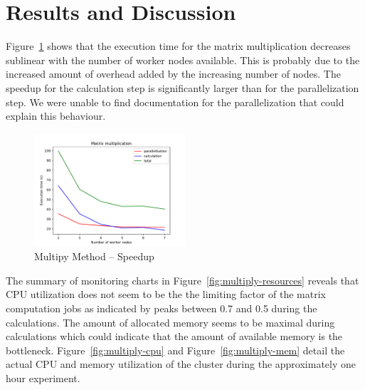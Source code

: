 \documentclass{prog_report}
\begin{document}
\section{Results and Discussion}


Figure~\ref{fig:multiply} shows that the execution time for the matrix multiplication decreases sublinear with the number of worker nodes available. This is probably due to the increased amount of overhead added by the increasing number of nodes. 
The speedup for the calculation step is significantly larger than for the parallelization step. We were unable to find documentation for the parallelization that could explain this behaviour.

\begin{figure}[h!]
    \centering
    \includegraphics[width=0.5\textwidth]{img/multiply-speedup.pdf}
    \caption{Multipy Method – Speedup}
    \label{fig:multiply}
\end{figure}

The summary of monitoring charts in Figure~\ref{fig:multiply-resources} reveals that CPU utilization does not seem to be the the limiting factor of the matrix computation jobs as indicated by peaks between 0.7 and 0.5 during the calculations. 
The amount of allocated memory seems to be maximal during calculations which could indicate that the amount of available memory is the bottleneck.
Figure~\ref{fig:multiply-cpu} and Figure~\ref{fig:multiply-mem} detail the actual CPU and memory utilization of the cluster during the approximately one hour experiment.
\end{document}
